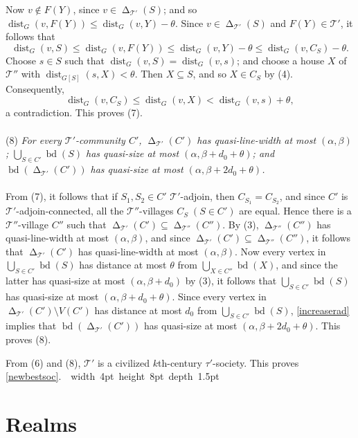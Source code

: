 \documentclass[titlepage,11pt]{article}
\newcommand\blackslug{\hbox{\hskip 1pt \vrule width 4pt height 8pt depth 1.5pt
		\hskip 1pt}}
\newcommand\bbox{\hfill \quad \blackslug \bigbreak}
\newcommand{\dist}{\operatorname{dist}}
\newcommand{\voro}{\operatorname{\Delta}}
\newcommand{\bd}{\operatorname{bd}}
\newcommand{\mac}{\mathcal}
\begin{document}
	Now $v\notin F(Y)$, since $v\in \voro_{\mac T'}(S)$; and so 
	$\dist_G(v,F(Y))\le\dist_G(v,Y)-\theta$. Since $v\in \voro_{\mac T'}(S)$ and $F(Y)\in \mac T'$, it follows that 
	$$\dist_G(v,S)\le \dist_G(v,F(Y))\le\dist_G(v,Y)-\theta\le \dist_G(v,C_S)-\theta.$$
	Choose $s\in S$ such that $\dist_G(v,S) = \dist_G(v,s)$; and choose a house $X$ of $\mac T''$ with $\dist_{G[S]}(s,X)<\theta$. 
	Then $X\subseteq S$, and so $X\in C_S$ by (4). Consequently, 
	$$\dist_G(v,C_S)\le \dist_G(v,X)< \dist_G(v,s) + \theta,$$
	a contradiction. This proves (7).
	\\
	\\
	(8) {\em For every $\mac T'$-community $C'$, $\voro_{\mac T'}(C')$ has quasi-line-width at most $(\alpha,\beta)$;
		$\bigcup_{S\in C'}\bd (S)$ has quasi-size at most $(\alpha,\beta+d_0+\theta)$; and
		$\bd(\voro_{\mac T'}(C'))$ has quasi-size at most $(\alpha, \beta+2d_0+\theta)$.}
	\\
	\\
	From (7), it follows that if $S_1,S_2\in C'$ $\mac T'$-adjoin, then $C_{S_1} = C_{S_2}$, and since $C'$ is $\mac T'$-adjoin-connected, 
	all the $\mac T''$-villages $C_S \;(S\in C')$ are equal. 
	Hence there is a $\mac T''$-village $C''$ such that $\voro_{\mac T'}(C')\subseteq \voro_{\mac T''}(C'')$. By (3), 
	$\voro_{\mac T''}(C'')$ has quasi-line-width at most $(\alpha,\beta)$, and since 
	$\voro_{\mac T'}(C')\subseteq \voro_{\mac T''}(C'')$,
	it follows that $\voro_{\mac T'}(C')$ has quasi-line-width at most $(\alpha,\beta)$. 
	Now every vertex in $\bigcup_{S\in C'}\bd(S)$
	has distance at most $\theta$ from $\bigcup_{X\in C''}\bd (X)$, and since the latter has quasi-size at most $(\alpha,\beta+d_0)$
	by (3), it follows that $\bigcup_{S\in C'}\bd (S)$ has quasi-size at most $(\alpha,\beta+d_0+\theta)$. 
	Since every vertex in $\voro_{\mac T'}(C')\setminus V(C')$ has distance at most $d_0$ from $\bigcup_{S\in C'}\bd (S)$,
	\ref{increaserad} implies that
	$\bd(\voro_{\mac T'}(C'))$ has quasi-size at most $(\alpha, \beta+2d_0+\theta)$. This proves (8).
	
	\bigskip
	
	From (6) and (8), $\mac T'$ is a civilized
	$k$th-century $\tau'$-society. This proves \ref{newbestsoc}.~\bbox
	
	
	\section{Realms}
	
\end{document}
